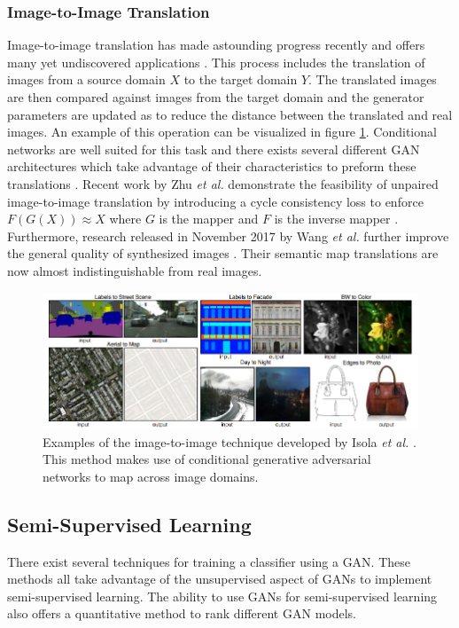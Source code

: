 \documentclass[11pt]{article}
\begin{document}
\subsubsection{Image-to-Image Translation}
Image-to-image translation has made astounding progress recently and offers many yet undiscovered applications \citep{2017arXiv170100160G}. This process includes the translation of images from a source domain $X$ to the target domain $Y$. The translated images are then compared against images from the target domain and the generator parameters are updated as to reduce the distance between the translated and real images. An example of this operation can be visualized in figure \ref{fig:img2img}. Conditional networks are well suited for this task and there exists several different GAN architectures which take advantage of their characteristics to preform these translations \citep{2016arXiv161107004I, 2017arXiv171111585W, 2017arXiv170310593Z}. Recent work by Zhu \textit{et al.} demonstrate the feasibility of unpaired image-to-image translation by introducing a cycle consistency loss to enforce $F(G(X)) \approx X$ where $G$ is the mapper and $F$ is the inverse mapper \citep{2017arXiv170310593Z}. Furthermore, research released in November 2017 by Wang \textit{et al.} further improve the general quality of synthesized images \citep{2017arXiv171111585W}. Their semantic map translations are now almost indistinguishable from real images.

\begin{figure}
\centering
\includegraphics[scale=0.55]{img2img}
\caption{Examples of the image-to-image technique developed by Isola \textit{et al.} \citep{2016arXiv161107004I}. This method makes use of conditional generative adversarial networks to map across image domains.}
\label{fig:img2img}
\end{figure}

\subsection{Semi-Supervised Learning} \label{sec:semisupervised}
There exist several techniques for training a classifier using a GAN. These methods all take advantage of the unsupervised aspect of GANs to implement semi-supervised learning. The ability to use GANs for semi-supervised learning also offers a quantitative method to rank different GAN models.
\end{document}
